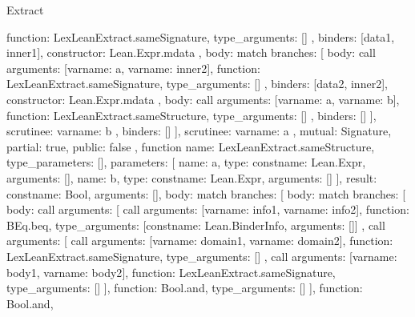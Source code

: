 \begin{lexlean}{Extract}
\begin{toolingmodule}
{{{{{              function: LexLeanExtract.sameSignature,
              type_arguments: []
            },
            binders: [data1, inner1],
            constructor: Lean.Expr.mdata
          },
          {
            body: match{
              branches: [
                {
                  body: call{
                    arguments: [var{name: a}, var{name: inner2}],
                    function: LexLeanExtract.sameSignature,
                    type_arguments: []
                  },
                  binders: [data2, inner2],
                  constructor: Lean.Expr.mdata
                },
                {
                  body: call{
                    arguments: [var{name: a}, var{name: b}],
                    function: LexLeanExtract.sameStructure,
                    type_arguments: []
                  },
                  binders: []
                }
              ],
              scrutinee: var{name: b}
            },
            binders: []
          }
        ],
        scrutinee: var{name: a}
      },
      mutual: Signature,
      partial: true,
      public: false
    },
    function{
      name: LexLeanExtract.sameStructure,
      type_parameters: [],
      parameters: [
        {name: a, type: const{name: Lean.Expr, arguments: []}},
        {name: b, type: const{name: Lean.Expr, arguments: []}}
      ],
      result: const{name: Bool, arguments: []},
      body: match{
        branches: [
          {
            body: match{
              branches: [
                {
                  body: call{
                    arguments: [
                      call{
                        arguments: [var{name: info1}, var{name: info2}],
                        function: BEq.beq,
                        type_arguments: [const{name: Lean.BinderInfo, arguments: []}]
                      },
                      call{
                        arguments: [
                          call{
                            arguments: [var{name: domain1}, var{name: domain2}],
                            function: LexLeanExtract.sameSignature,
                            type_arguments: []
                          },
                          call{
                            arguments: [var{name: body1}, var{name: body2}],
                            function: LexLeanExtract.sameSignature,
                            type_arguments: []
                          }
                        ],
                        function: Bool.and,
                        type_arguments: []
                      }
                    ],
                    function: Bool.and,
}}}}}}}
\end{toolingmodule}
\end{lexlean}
